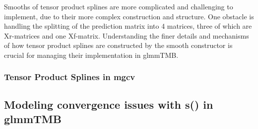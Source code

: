 \documentclass[12pt, twoside,hidelinks]{article}
\theoremstyle{definition}
\numberwithin{equation}{section}
\begin{document}
Smooths of tensor product splines are more complicated and challenging to implement, due to their more complex construction and structure. One obstacle is handling the splitting of the prediction matrix into 4 matrices, three of which are Xr-matrices and one Xf-matrix. Understanding the finer details and mechanisms of how tensor product splines are constructed by the smooth constructor is crucial for managing their implementation in glmmTMB. 

\subsubsection{Tensor Product Splines in mgcv}


\subsection{Modeling convergence issues with s() in \textbf{glmmTMB}}
\end{document}
